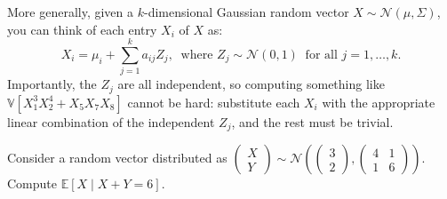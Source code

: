 More generally, given a $k$-dimensional Gaussian random vector
$X \sim \mathcal{N}(\mu, \Sigma)$, you can think of each entry $X_i$ of $X$ as:
\[ X_i = \mu_i + \sum_{j = 1}^k a_{ij} Z_j, ~ \text{ where } 
Z_j \sim \mathcal{N}(0, 1) ~ \text{ for all } j = 1, \dots, k. \]
Importantly, the $Z_j$ are all independent,
so computing something like $\mathbb{V}[X_1^3X_2^4 + X_5X_7X_8]$ cannot be hard:
substitute each $X_i$ with the appropriate linear combination of the independent $Z_j$,
and the rest must be trivial.

\begin{problem}
    Consider a random vector distributed as
    $\begin{pmatrix} X \\ Y \end{pmatrix} \sim
    \mathcal{N}\left(\begin{pmatrix} 3 \\ 2 \end{pmatrix},
    \begin{pmatrix} 4 & 1 \\ 1 & 6 \end{pmatrix}\right)$.
    Compute $\mathbb{E}[X \mid X + Y = 6]$.
\end{problem}

